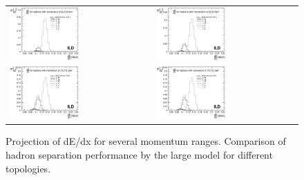 \documentclass[preprint]{elsarticle}
\begin{document}
\begin{figure}[h!]
\centering
\begin{tabular}{ll}
  \includegraphics[width=0.5\textwidth]{figures_Methods/separation_had_2GeV_bbbar_vs_ttbar_v2.eps} & 
  \includegraphics[width=0.5\textwidth]{figures_Methods/separation_had_5GeV_bbbar_vs_ttbar_v2.eps} \\ 
  \includegraphics[width=0.5\textwidth]{figures_Methods/separation_had_10GeV_bbbar_vs_ttbar_v2.eps} & 
  \includegraphics[width=0.5\textwidth]{figures_Methods/separation_had_10GeV_bbbar_vs_ttbar_v2.eps} 	
\end{tabular}
\caption{Projection of dE/dx for several momentum ranges. Comparison of hadron separation performance by the large model for different topologies. }
\label{fig_dEdx_2}
\end{figure}
\end{document}
